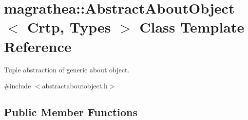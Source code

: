 \hypertarget{classmagrathea_1_1AbstractAboutObject}{\section{magrathea\-:\-:Abstract\-About\-Object$<$ Crtp, Types $>$ Class Template Reference}
\label{classmagrathea_1_1AbstractAboutObject}
}


Tuple abstraction of generic about object.  




{\ttfamily \#include $<$abstractaboutobject.\-h$>$}

\subsection*{Public Member Functions}
